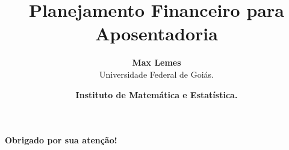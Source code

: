 \documentclass[aspectratio=1610,12pt]{beamer} %
\title
  {Planejamento Financeiro para Aposentadoria}
\author[Max Lemes]
  {
   \textbf{Max Lemes} \\
   Universidade Federal de Goiás.
  }
\date
  {
    \textcolor{UFGorange}{\textbf{Instituto de Matemática e Estatística.}}\\
  }
\begin{document}
\maketitle



\begin{frame}[c]\frametitle{}
  \begin{center}
    \LARGE \textcolor{UFGblue}{\textbf{Obrigado por sua atenção!}}
  \end{center}
\end{frame}
\end{document}
